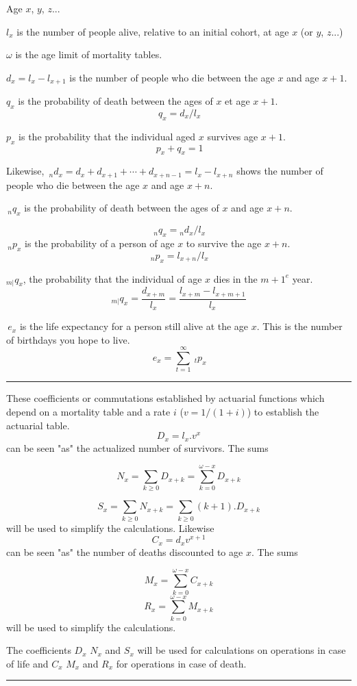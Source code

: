 
\begin{f}

Age $x$, $y$, $z$...    

$l_x$ is the number of people alive, relative to an initial cohort, at age $x$ (or $y$, $z$...)

$\omega$ is the age limit of mortality tables.

$d_x=l_x-l_{x+1}$ is the number of people who die between the age $x$ and age $x+1$.

$q_x$ is the probability of death between the ages of $x$ et age $x+1$.
$$
\,q_x = d_x / l_x 
$$

$p_x$ is the probability that the individual aged $x$ survives age $x+1$.
$$
\,p_x+q_x=1 
$$

Likewise,
$\,_nd_x = d_x + d_{x+1} + \cdots + d_{x+n-1} = l_x - l_{x+n}$ shows the number of people who die between the age $x$ and age $x+n$.

$\,_nq_x$ is the probability of death between the ages of $x$ and age $x+n$.

$$
\,_nq_x = {}_nd_x / l_x
$$
$\,_np_x$ is the probability of a person of age $x$ to survive the age $x+n$.
$$
\,_np_x = l_{x+n} / l_x 
$$


${}_{m|}q_{x}$, the probability that the individual of age $x$ dies in the ${m+1}^e$ year.
$${}_{m|}q_{x}=\frac{d_{x+m}}{l_x}=\frac{l_{x+m}-l_{x+m+1}}{l_x}$$

$\,e_x$ is the life expectancy for a person still alive at the age $x$. 
This is the number of birthdays you hope to live.
$$
\,e_x = \sum_{t=1}^{\infty} \ _tp_x 
$$
\end{f}
\hrule

\begin{f}


These coefficients or commutations established by actuarial functions which depend on a mortality table and a rate $i$ ($v=1/(1+i)$) to establish the actuarial table.
$$
D_x=l_x .v^x
$$
can be seen "as" the actualized number of survivors. The sums

$$
N_x=\sum_{k\geq 0} D_{x+k}=\sum_{k= 0}^{\omega-x} D_{x+k}
$$

$$
S_x=\sum_{k\geq 0} N_{x+k}=\sum_{k\geq 0}(k+1). D_{x+k}
$$
will be used to simplify the calculations.
Likewise
$$
C_x = d_x v^{ x+1} 
$$
can be seen "as" the number of deaths discounted to age $x$. The sums

$$
M_x=\sum_{k= 0}^{\omega-x} C_{x+k}
$$
$$
R_x=\sum_{k= 0}^{\omega-x} M_{x+k}
$$
will be used to simplify the calculations.

The coefficients $D_x$ $N_x$ and $S_x$ will be used for calculations on operations in case of life and $C_x$ $M_x$ and $R_x$ for operations in case of death.

\end{f} 
\hrule

